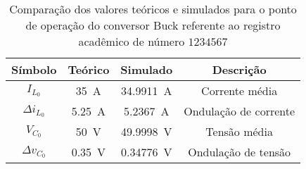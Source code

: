 \begin{table}[!ht]
\centering
\caption{Comparação dos valores teóricos e simulados para o ponto de operação do conversor Buck referente ao registro acadêmico de número $1234567$}
\label{tab:steadystatesim}
\begin{tabular}{@{}cccc@{}}
\toprule
\textbf{Símbolo} & \textbf{Teórico} & \textbf{Simulado} & \textbf{Descrição}\\ \midrule
$I_{L_0}$ & \SI{35}{\A} & \SI{34.9911}{\A} & Corrente média\\
$\Delta{i_{L_0}}$  & \SI{5.25}{\A} & \SI{5.2367}{\A}& Ondulação de corrente\\
$V_{C_0}$ & \SI{50}{\V} & \SI{49.9998}{\V} & Tensão média\\
$\Delta{v_{C_0}}$  & \SI{0.35}{\V} & \SI{0.34776}{\V}& Ondulação de tensão \\
\bottomrule
\end{tabular}
\end{table}

